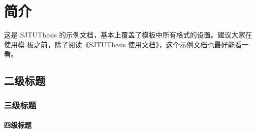 \documentclass{sjtureport}
\begin{document}



\begin{abstract}[zh]
	中文摘要应该将学位论文的内容要点简短明了地表达出来，应该包含论文中的基本信息，
	体现科研工作的核心思想。摘要内容应涉及本项科研工作的目的和意义、研究方法、研究
	成果、结论及意义。注意突出学位论文中具有创新性的成果和新见解的部分。摘要中不宜
	使用公式、化学结构式、图表和非公知公用的符号和术语，不标注引用文献编号。硕士学
	位论文中文摘要字数为 500 字左右，博士学位论文中文摘要字数为 800 字左右。英文摘
	要内容应与中文摘要内容一致。

	摘要页的下方注明本文的关键词（4 \textasciitilde{} 6 个）。
\end{abstract}

\begin{abstract}[en]
	Shanghai Jiao Tong University (SJTU) is a key university in China. SJTU was
	founded in 1896. It is one of the oldest universities in China. The University
	has nurtured large numbers of outstanding figures include JIANG Zemin, DING
	Guangen, QIAN Xuesen, Wu Wenjun, WANG An, etc.

	SJTU has beautiful campuses, Bao Zhaolong Library, Various laboratories. It
	has been actively involved in international academic exchange programs. It is
	the center of CERNet in east China region, through computer networks, SJTU has
	faster and closer connection with the world.
\end{abstract}

\tableofcontents



\chapter{简介}

这是 SJTUThesis 的示例文档，基本上覆盖了模板中所有格式的设置。建议大家在使用模
板之前，除了阅读《SJTUThesis 使用文档》，这个示例文档也最好能看一看。

\section{二级标题}

\subsection{三级标题}

\subsubsection{四级标题}
\end{document}
